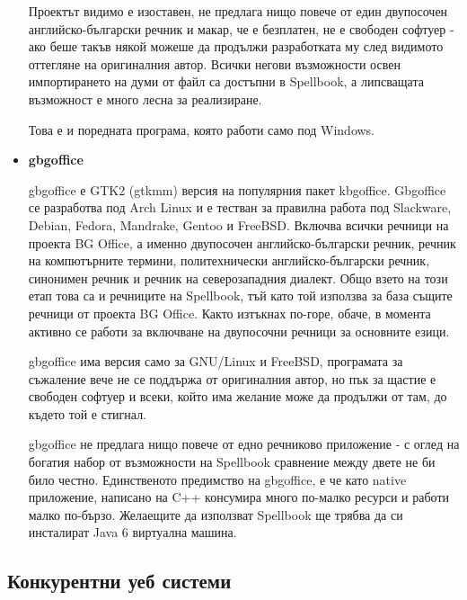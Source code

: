 \begin{itemize}
    Проектът видимо е изоставен, не предлага нищо повече от един
    двупосочен английско-български речник и макар, че е безплатен, не
    е свободен софтуер - ако беше такъв някой можеше да продължи
    разработката му след видимото оттегляне на оригиналния
    автор. Всички негови възможности освен импортирането на думи от
    файл са достъпни в Spellbook, а липсващата възможност е много
    лесна за реализиране.

    Това е и поредната програма, която работи само под Windows.

  \item \textbf{gbgoffice}

    gbgoffice е GTK2 (gtkmm) версия на популярния пакет
    kbgoffice. Gbgoffice се разработва под Arch Linux и е тестван за
    правилна работа под Slackware, Debian, Fedora, Mandrake, Gentoo и
    FreeBSD. Включва всички речници на проекта BG Office, а именно
    двупосочен английско-български речник, речник на компютърните
    термини, политехнически английско-български речник, синонимен
    речник и речник на северозападния диалект. Общо взето на този етап
    това са и речниците на Spellbook, тъй като той използва за база
    същите речници от проекта BG Office. Както изтъкнах по-горе,
    обаче, в момента активно се работи за включване на двупосочни
    речници за основните езици. 

    gbgoffice има версия само за GNU/Linux и FreeBSD, програмата за
    съжаление вече не се поддържа от оригиналния автор, но пък за
    щастие е свободен софтуер и всеки, който има желание може да
    продължи от там, до където той е стигнал.

    gbgoffice не предлага нищо повече от едно речниково приложение - с
    оглед на богатия набор от възможности на Spellbook сравнение между
    двете не би било честно. Единственото предимство на gbgoffice, е
    че като native приложение, написано на C++ консумира много
    по-малко ресурси и работи малко по-бързо. Желаещите да използват
    Spellbook ще трябва да си инсталират Java 6 виртуална машина.
\end{itemize}
\subsection{Конкурентни уеб системи}

